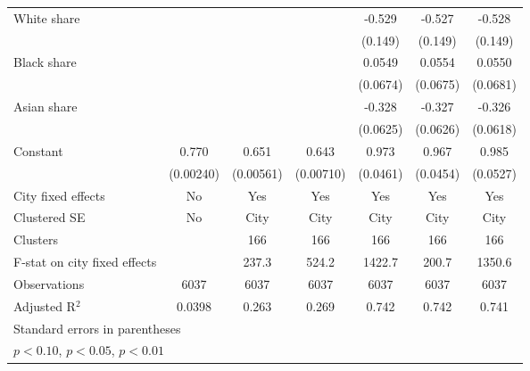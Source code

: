 {\begin{tabular}{l*{6}{c}}
\addlinespace
White share         &                     &                     &                     &      -0.529\sym{***}&      -0.527\sym{***}&      -0.528\sym{***}\\
                    &                     &                     &                     &     (0.149)         &     (0.149)         &     (0.149)         \\
\addlinespace
Black share         &                     &                     &                     &      0.0549         &      0.0554         &      0.0550         \\
                    &                     &                     &                     &    (0.0674)         &    (0.0675)         &    (0.0681)         \\
\addlinespace
Asian share         &                     &                     &                     &      -0.328\sym{***}&      -0.327\sym{***}&      -0.326\sym{***}\\
                    &                     &                     &                     &    (0.0625)         &    (0.0626)         &    (0.0618)         \\
\addlinespace
Constant            &       0.770\sym{***}&       0.651\sym{***}&       0.643\sym{***}&       0.973\sym{***}&       0.967\sym{***}&       0.985\sym{***}\\
                    &   (0.00240)         &   (0.00561)         &   (0.00710)         &    (0.0461)         &    (0.0454)         &    (0.0527)         \\
\midrule
City fixed effects  &          No         &         Yes         &         Yes         &         Yes         &         Yes         &         Yes         \\
Clustered SE        &          No         &        City         &        City         &        City         &        City         &        City         \\
Clusters            &                     &         166         &         166         &         166         &         166         &         166         \\
F-stat on city fixed effects&                     &       237.3         &       524.2         &      1422.7         &       200.7         &      1350.6         \\
Observations        &        6037         &        6037         &        6037         &        6037         &        6037         &        6037         \\
Adjusted R$^2$      &      0.0398         &       0.263         &       0.269         &       0.742         &       0.742         &       0.741         \\
\bottomrule
\multicolumn{7}{l}{\footnotesize Standard errors in parentheses}\\
\multicolumn{7}{l}{\footnotesize \sym{*} \(p<0.10\), \sym{**} \(p<0.05\), \sym{***} \(p<0.01\)}\\
\end{tabular}
}
